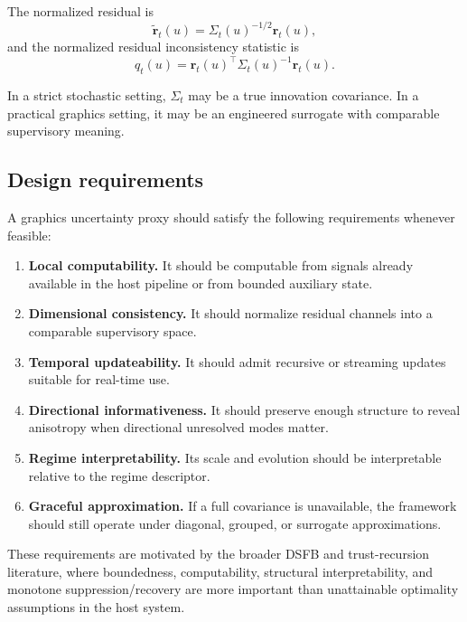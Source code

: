 \documentclass[11pt]{article}
\theoremstyle{definition}
\theoremstyle{plain}
\begin{document}
The normalized residual is
\begin{equation}
\tilde{\mathbf r}_t(u)=\Sigma_t(u)^{-1/2}\mathbf r_t(u),
\end{equation}
and the normalized residual inconsistency statistic is
\begin{equation}
q_t(u)=\mathbf r_t(u)^\top \Sigma_t(u)^{-1}\mathbf r_t(u).
\end{equation}

In a strict stochastic setting, $\Sigma_t$ may be a true innovation covariance. In a practical graphics setting, it may be an engineered surrogate with comparable supervisory meaning.


\subsection{Design requirements}

A graphics uncertainty proxy should satisfy the following requirements whenever feasible:

\begin{enumerate}[leftmargin=1.5em]
    \item \textbf{Local computability.} It should be computable from signals already available in the host pipeline or from bounded auxiliary state.
    \item \textbf{Dimensional consistency.} It should normalize residual channels into a comparable supervisory space.
    \item \textbf{Temporal updateability.} It should admit recursive or streaming updates suitable for real-time use.
    \item \textbf{Directional informativeness.} It should preserve enough structure to reveal anisotropy when directional unresolved modes matter.
    \item \textbf{Regime interpretability.} Its scale and evolution should be interpretable relative to the regime descriptor.
    \item \textbf{Graceful approximation.} If a full covariance is unavailable, the framework should still operate under diagonal, grouped, or surrogate approximations.
\end{enumerate}

These requirements are motivated by the broader DSFB and trust-recursion literature, where boundedness, computability, structural interpretability, and monotone suppression/recovery are more important than unattainable optimality assumptions in the host system.
\end{document}
